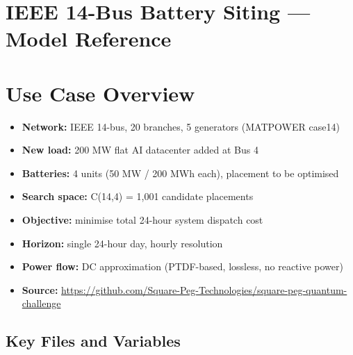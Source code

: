 \documentclass[11pt]{article}
\begin{document}
\section*{IEEE 14-Bus Battery Siting --- Model Reference}

\tableofcontents
\newpage

\section{Use Case Overview}

\begin{itemize}[noitemsep]
  \item \textbf{Network:} IEEE 14-bus, 20 branches, 5 generators (MATPOWER case14)
  \item \textbf{New load:} 200 MW flat AI datacenter added at Bus 4
  \item \textbf{Batteries:} 4 units (50 MW / 200 MWh each), placement to be optimised
  \item \textbf{Search space:} C(14,4) = 1,001 candidate placements
  \item \textbf{Objective:} minimise total 24-hour system dispatch cost
  \item \textbf{Horizon:} single 24-hour day, hourly resolution
  \item \textbf{Power flow:} DC approximation (PTDF-based, lossless, no reactive power)
  \item \textbf{Source:} \url{https://github.com/Square-Peg-Technologies/square-peg-quantum-challenge}
\end{itemize}

\subsection*{Key Files and Variables}
\end{document}
